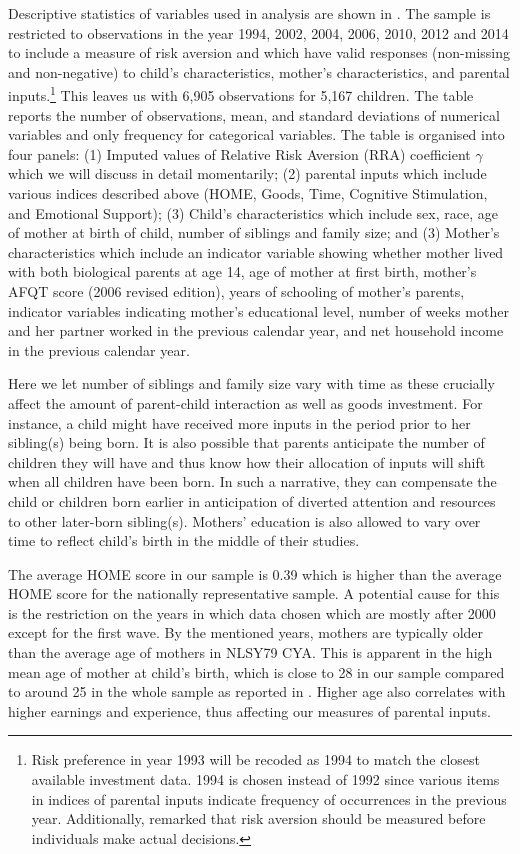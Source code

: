 \documentclass[emulatestandardclasses, 10pt, abstract = true]{scrartcl}
\begin{document}
Descriptive statistics of variables used in analysis are shown in . The sample is restricted to observations in the year 1994, 2002, 2004, 2006, 2010, 2012 and 2014 to include a measure of risk aversion and which have valid responses (non-missing and non-negative) to child's characteristics, mother's characteristics, and parental inputs.\footnote{Risk preference in year 1993 will be recoded as 1994 to match the closest available investment data. 1994 is chosen instead of 1992 since various items in indices of parental inputs indicate frequency of occurrences in the previous year. Additionally, \citet{hartog2002linking} remarked that risk aversion should be measured before individuals make actual decisions.} This leaves us with 6,905 observations for 5,167 children. The table reports the number of observations, mean, and standard deviations of numerical variables and only frequency for categorical variables. The table is organised into four panels: (1) Imputed values of Relative Risk Aversion (RRA) coefficient $\gamma$ which we will discuss in detail momentarily; (2) parental inputs which include various indices described above (HOME, Goods, Time, Cognitive Stimulation, and Emotional Support); (3) Child's characteristics which include sex, race, age of mother at birth of child, number of siblings and family size; and (3) Mother's characteristics which include an indicator variable showing whether mother lived with both biological parents at age 14, age of mother at first birth, mother's AFQT score (2006 revised edition), years of schooling of mother's parents, indicator variables indicating mother's educational level, number of weeks mother and her partner worked in the previous calendar year, and net household income in the previous calendar year. 

Here we let number of siblings and family size vary with time as these crucially affect the amount of parent-child interaction as well as goods investment. For instance, a child might have received more inputs in the period prior to her sibling(s) being born. It is also possible that parents anticipate the number of children they will have and thus know how their allocation of inputs will shift when all children have been born. In such a narrative, they can compensate the child or children born earlier in anticipation of diverted attention and resources to other later-born sibling(s). Mothers' education is also allowed to vary over time to reflect child's birth in the middle of their studies. 

The average HOME score in our sample is 0.39 which is higher than the average HOME score for the nationally representative sample. A potential cause for this is the restriction on the years in which data chosen which are mostly after 2000 except for the first wave. By the mentioned years, mothers are typically older than the average age of mothers in NLSY79 CYA. This is apparent in the high mean age of mother at child's birth, which is close to 28 in our sample compared to around 25 in the whole sample as reported in \citet{carneiro2016partial}. Higher age also correlates with higher earnings and experience, thus affecting our measures of parental inputs. 
\end{document}
